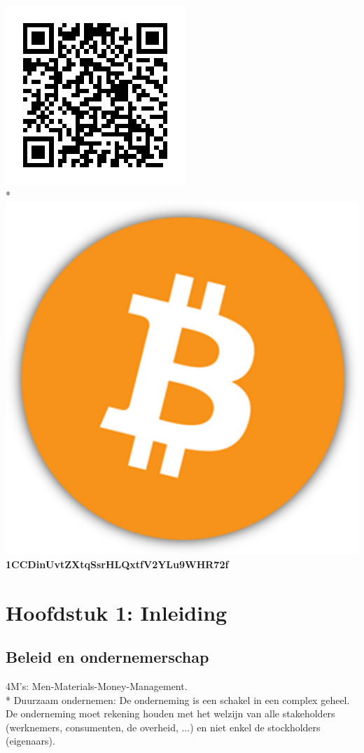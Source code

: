 \documentclass[12pt]{article}
\begin{document}
\begin{center}
\includegraphics[scale=0.5]{BitcoinAddress.png}\\*
\includegraphics[scale=0.02]{Bitcoin.png} \textbf{1CCDinUvtZXtqSsrHLQxtfV2YLu9WHR72f}
\end{center}
\clearpage
\section{Hoofdstuk 1: Inleiding}
\subsection{Beleid en ondernemerschap}
4M's: Men-Materials-Money-Management.\\*
Duurzaam ondernemen: De onderneming is een schakel in een complex geheel. De onderneming moet rekening houden met het welzijn van alle stakeholders (werknemers, consumenten, de overheid, ...) en niet enkel de stockholders (eigenaars).
\end{document}
